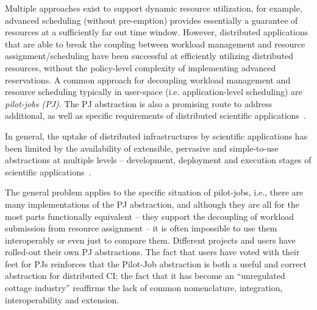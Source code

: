 \documentclass[conference,final]{IEEEtran}
\begin{document}





Multiple approaches exist to support dynamic resource utilization, for
example, advanced scheduling (without pre-emption) provides
essentially a guarantee of resources at a sufficiently far out time
window.  However, distributed applications that are able to 
break the coupling between workload management and
resource assignment/scheduling have been successful at efficiently
utilizing distributed resources, without the policy-level complexity
of implementing advanced reservations.  A common approach for
decoupling workload management and resource scheduling typically in
user-space (i.e. application-level scheduling) are \emph{pilot-jobs
  (PJ)}.  The PJ abstraction is also a promising route to address
additional, as well as specific requirements of distributed scientific
applications~\cite{ko-efficient,DBLP:conf/hpdc/KimHMAJ10,bigjob_cloudcom10}.


In general, the uptake of distributed infrastructures by scientific
applications has been limited by the availability of extensible,
pervasive and simple-to-use abstractions at multiple levels –
development, deployment and execution stages of scientific
applications~\cite{dpagrid2009}.

The general problem applies to the specific situation of pilot-jobs,
i.e., there are many implementations of the PJ abstraction, and
although they are all for the most parts functionally equivalent --
they support the decoupling of workload submission from resource
assignment -- it is often impossible to use them interoperably or even
just to compare them.  Different projects and users have
rolled-out their own PJ abstractions. The fact that users have voted
with their feet for PJs reinforces that the Pilot-Job abstraction 
is both a useful and correct abstraction for distributed CI; 
the fact that it has become an ``unregulated cottage industry'' 
reaffirms the lack of common nomenclature, integration, interoperability 
and extension.
\end{document}
